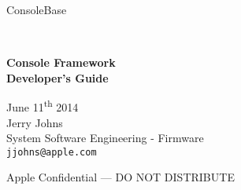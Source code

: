 
 {ConsoleBase}



\begin{titlepage}

\setlength{\parindent}{0in}

{
	\fontsize{32}{32}\selectfont
	\textcolor{AppleGray}{\AppleLogo}
}
\\[0.25in]

{
    \begin{spacing}{1.0}
	\fontsize{32}{32}\selectfont
	\textcolor{SmokeyDarkBlue}{\bfseries Console Framework} \\
	\textbf{Developer's Guide} \\
    \end{spacing}
}

June 11\textsuperscript{th} 2014
\\[0.25in]

Jerry Johns \\
System Software Engineering - Firmware \\
\small\texttt{jjohns@apple.com}

\vfill

\begin{center}
Apple Confidential --- DO NOT DISTRIBUTE
\end{center}

\end{titlepage}

\clearpage
\fancyhfoffset[r]{0in}

\setcounter{tocdepth}{4}
\tableofcontents

